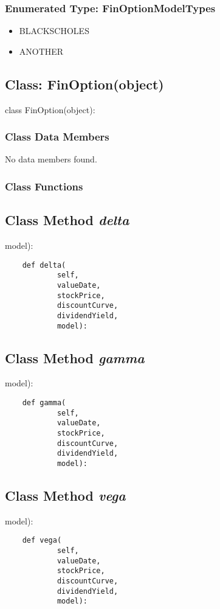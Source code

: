 \documentclass[twoside,11pt]{book}
\begin{document}
\subsubsection{Enumerated Type: FinOptionModelTypes}
\begin{itemize}
\item{BLACKSCHOLES}
\item{ANOTHER}
\end{itemize}

\subsection{Class: FinOption(object)}
class FinOption(object):

\subsubsection{Class Data Members}
No data members found.

\subsubsection{Class Functions}

\subsection{Class Method {\it delta}}
model):

\begin{lstlisting}
    def delta(
            self,
            valueDate,
            stockPrice,
            discountCurve,
            dividendYield,
            model):
\end{lstlisting}

\subsection{Class Method {\it gamma}}
model):

\begin{lstlisting}
    def gamma(
            self,
            valueDate,
            stockPrice,
            discountCurve,
            dividendYield,
            model):
\end{lstlisting}

\subsection{Class Method {\it vega}}
model):

\begin{lstlisting}
    def vega(
            self,
            valueDate,
            stockPrice,
            discountCurve,
            dividendYield,
            model):
\end{lstlisting}
\end{document}
